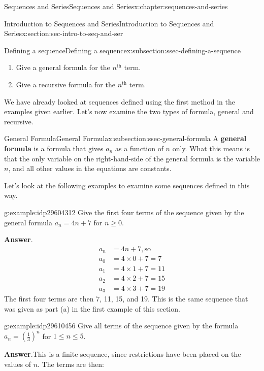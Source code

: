 \documentclass[twoside,10pt,]{book}
\newcommand{\blocktitlefont}{\relax}
\newcommand{\terminology}[1]{\textbf{#1}}
\numberwithin{equation}{section}
\newcommand{\nth}{{n^{\text{th}}}}
\newcommand{\amp}{&}
\begin{document}
\begin{chapterptx}{Sequences and Series}{}{Sequences and Series}{}{}{x:chapter:sequences-and-series}
\begin{sectionptx}{Introduction to Sequences and Series}{}{Introduction to Sequences and Series}{}{}{x:section:sec-intro-to-seq-and-ser}
\begin{subsectionptx}{Defining a sequence}{}{Defining a sequence}{}{}{x:subsection:ssec-defining-a-sequence}
\begin{enumerate}[label=(\alph*)]
\item{}Give a general formula for the \(\nth{}\) term.%
\item{}Give a recursive formula for the \(\nth{}\) term.%
\end{enumerate}
%
\par
We have already looked at sequences defined using the first method in the examples given earlier.  Let's now examine the two types of formula, general and recursive.%
\end{subsectionptx}
%
%
\typeout{************************************************}
\typeout{************************************************}
%
\begin{subsectionptx}{General Formula}{}{General Formula}{}{}{x:subsection:ssec-general-formula}
A \terminology{general formula} is a formula that gives \(a_n\) as a function of \(n\) only.  What this means is that the only variable on the right-hand-side of the general formula is the variable \(n\), and all other values in the equations are constants.%
\par
Let's look at the following examples to examine some sequences defined in this way. \begin{example}{}{g:example:idp29604312}%
Give the first four terms of the sequence given by the general formula \(a_n = 4n + 7\) for \(n \ge 0\).\par\smallskip%
\noindent\textbf{\blocktitlefont Answer}.\label{g:answer:idp29609048}{}\hypertarget{g:answer:idp29609048}{}\quad{}%
\begin{align*}
a_n \amp = 4n + 7, \text{so}\\
a_0 \amp = 4\times0 + 7 = 7\\
a_1 \amp = 4\times1 + 7 = 11\\
a_2 \amp = 4\times2 + 7 = 15\\
a_3 \amp = 4\times3 + 7 = 19
\end{align*}
The first four terms are then 7, 11, 15, and 19.  This is the same sequence that was given as part (a) in the first  example of this section.\end{example}
 \begin{example}{}{g:example:idp29610456}%
Give all terms of the sequence given by the formula \({a_n} = {\left( {\frac{1}{3}} \right)^n}\) for \(1 \le n \le 5\).\par\smallskip%
\noindent\textbf{\blocktitlefont Answer}.\label{g:answer:idp29611864}{}\hypertarget{g:answer:idp29611864}{}\quad{}This is a finite sequence, since restrictions have been placed on the values of \(n\).  The terms are then:%

\end{example}
\end{subsectionptx}
\end{sectionptx}
\end{chapterptx}
\end{document}
